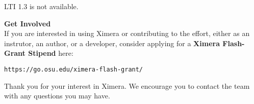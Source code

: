 \documentclass{article}
\begin{document}
\begin{multicols}{2}
\begin{xframe}
        LTI
        1.3 is not
        available.
    \end{xframe}
    \begin{xframe}
        {\sffamily\bfseries Get Involved}\\
        If you are interested in using Ximera or contributing to the effort,
        either
        as an instrutor, an author, or a developer, consider
        applying for a \textbf{Ximera Flash-Grant Stipend} here:
        \begin{center}
            \tt  https://go.osu.edu/ximera-flash-grant/
        \end{center}
        Thank you for your interest in Ximera. We encourage you
        to contact the team with  any questions you may have.
    \end{xframe}
\end{multicols}
\break{}\pagestyle{main}
\end{document}
